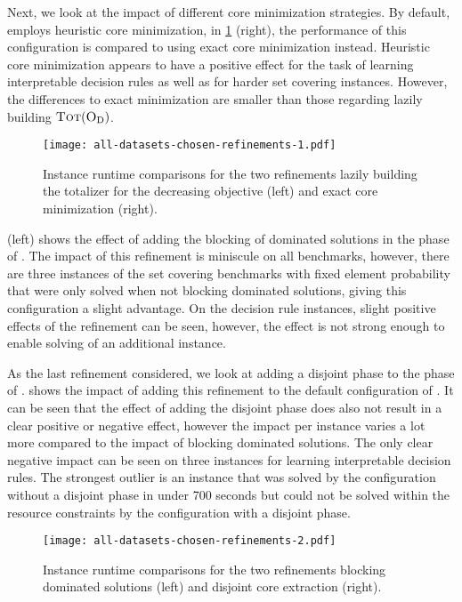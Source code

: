 Next, we look at the impact of different core minimization strategies.
By default, \msh{} employs heuristic core minimization, in \cref{fig:refinements-1} (right), the performance of this configuration is compared to using exact core minimization instead.
Heuristic core minimization appears to have a positive effect for the task of learning interpretable decision rules as well as for harder set covering instances.
However, the differences to exact minimization are smaller than those regarding lazily building $\textsc{Tot}(\textsc{O}_{\text{D}})$.

\begin{figure}
    \centering
    \texttt{[image: all-datasets-chosen-refinements-1.pdf]}
    \caption{Instance runtime comparisons for the two refinements lazily building the totalizer for the decreasing objective (left) and exact core minimization (right).}\label{fig:refinements-1}
\end{figure}

 (left) shows the effect of adding the blocking of dominated solutions in the \satunsat{} phase of \msh{}.
The impact of this refinement is miniscule on all benchmarks, however, there are three instances of the set covering benchmarks with fixed element probability that were only solved when not blocking dominated solutions, giving this configuration a slight advantage.
On the decision rule instances, slight positive effects of the refinement can be seen, however, the effect is not strong enough to enable solving of an additional instance.

As the last refinement considered, we look at adding a disjoint phase to the \msu{} phase of \msh{}.
 shows the impact of adding this refinement to the default configuration of \msh{}.
It can be seen that the effect of adding the disjoint phase does also not result in a clear positive or negative effect, however the impact per instance varies a lot more compared to the impact of blocking dominated solutions.
The only clear negative impact can be seen on three instances for learning interpretable decision rules.
The strongest outlier is an instance that was solved by the configuration without a disjoint phase in under 700 seconds but could not be solved within the resource constraints by the configuration with a disjoint phase.

\begin{figure}
    \centering
    \texttt{[image: all-datasets-chosen-refinements-2.pdf]}
    \caption{Instance runtime comparisons for the two refinements blocking dominated solutions (left) and disjoint core extraction (right).}\label{fig:refinements-2}
\end{figure}
